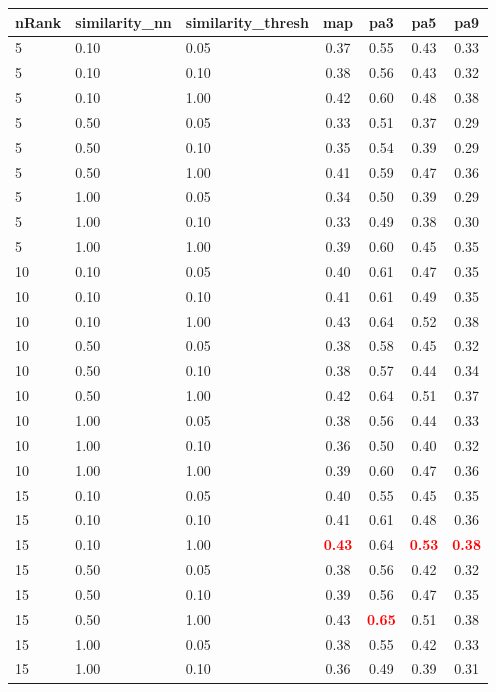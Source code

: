 \begin{tabular}{lllcccc} 
nRank & similarity\_nn & similarity\_thresh & map & pa3 & pa5 & pa9 \\ 
\hline 
 5 & 0.10 & 0.05 & 0.37 & 0.55 & 0.43 & 0.33 \\ 
 5 & 0.10 & 0.10 & 0.38 & 0.56 & 0.43 & 0.32 \\ 
 5 & 0.10 & 1.00 & 0.42 & 0.60 & 0.48 & 0.38 \\ 
 5 & 0.50 & 0.05 & 0.33 & 0.51 & 0.37 & 0.29 \\ 
 5 & 0.50 & 0.10 & 0.35 & 0.54 & 0.39 & 0.29 \\ 
 5 & 0.50 & 1.00 & 0.41 & 0.59 & 0.47 & 0.36 \\ 
 5 & 1.00 & 0.05 & 0.34 & 0.50 & 0.39 & 0.29 \\ 
 5 & 1.00 & 0.10 & 0.33 & 0.49 & 0.38 & 0.30 \\ 
 5 & 1.00 & 1.00 & 0.39 & 0.60 & 0.45 & 0.35 \\ 
10 & 0.10 & 0.05 & 0.40 & 0.61 & 0.47 & 0.35 \\ 
10 & 0.10 & 0.10 & 0.41 & 0.61 & 0.49 & 0.35 \\ 
10 & 0.10 & 1.00 & 0.43 & 0.64 & 0.52 & 0.38 \\ 
10 & 0.50 & 0.05 & 0.38 & 0.58 & 0.45 & 0.32 \\ 
10 & 0.50 & 0.10 & 0.38 & 0.57 & 0.44 & 0.34 \\ 
10 & 0.50 & 1.00 & 0.42 & 0.64 & 0.51 & 0.37 \\ 
10 & 1.00 & 0.05 & 0.38 & 0.56 & 0.44 & 0.33 \\ 
10 & 1.00 & 0.10 & 0.36 & 0.50 & 0.40 & 0.32 \\ 
10 & 1.00 & 1.00 & 0.39 & 0.60 & 0.47 & 0.36 \\ 
15 & 0.10 & 0.05 & 0.40 & 0.55 & 0.45 & 0.35 \\ 
15 & 0.10 & 0.10 & 0.41 & 0.61 & 0.48 & 0.36 \\ 
15 & 0.10 & 1.00 & \textbf{\textcolor{red}{0.43}} & 0.64 & \textbf{\textcolor{red}{0.53}} & \textbf{\textcolor{red}{0.38}} \\ 
15 & 0.50 & 0.05 & 0.38 & 0.56 & 0.42 & 0.32 \\ 
15 & 0.50 & 0.10 & 0.39 & 0.56 & 0.47 & 0.35 \\ 
15 & 0.50 & 1.00 & 0.43 & \textbf{\textcolor{red}{0.65}} & 0.51 & 0.38 \\ 
15 & 1.00 & 0.05 & 0.38 & 0.55 & 0.42 & 0.33 \\ 
15 & 1.00 & 0.10 & 0.36 & 0.49 & 0.39 & 0.31 \\ 

\end{tabular}
